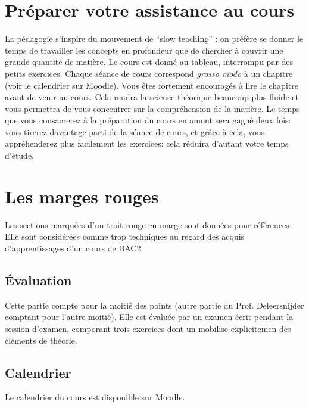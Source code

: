 \section{Préparer votre assistance au cours}

La pédagogie s'inspire du mouvement de ``slow teaching'' : on préfère se donner le temps de travailler les concepts en profondeur que de chercher à couvrir une grande quantité de matière. Le cours est donné au tableau, interrompu par des petits exercices. Chaque séance de cours correspond \emph{grosso modo} à un chapitre (voir le calendrier sur Moodle). Vous êtes fortement encouragés à lire le chapitre avant de venir au cours. Cela rendra la science théorique beaucoup plus fluide et vous permettra de vous concentrer sur la compréhension de la matière. Le temps que vous consacrerez à la préparation du cours en amont sera gagné deux fois: vous tirerez davantage parti de la séance de cours, et grâce à cela, vous appréhenderez plus facilement les exercices: cela réduira d'autant votre temps d'étude. 

\section{Les marges rouges}
\begin{redmargin}
Les sections marquées d'un trait rouge en marge sont données pour références. Elle sont considérées comme trop techniques au regard des acquis d'apprentissages d'un cours de BAC2. 
\end{redmargin}


\subsection{Évaluation}

Cette partie compte pour la moitié des points (autre partie du Prof. Deleersnijder comptant pour l'autre moitié). 
Elle est évaluée par un examen écrit pendant la session d'examen, comporant trois exercices dont un mobilise explicitemen des éléments de théorie. 

\subsection{Calendrier}

Le calendrier du cours est disponible sur Moodle.
